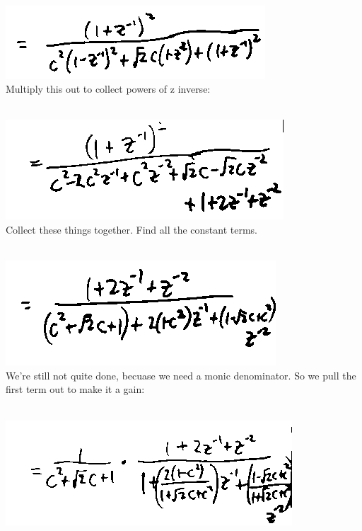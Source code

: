 \\
\includegraphics[scale=0.5]{frames/17g}\\

Multiply this out to collect powers of z inverse:

\\
\includegraphics[scale=0.5]{frames/17h}\\

Collect these things together. Find all the constant terms. 

\\
\includegraphics[scale=0.5]{frames/17i}\\

We're still not quite done, becuase we need a monic denominator. So we pull
the first term out to make it a gain:

\\
\includegraphics[scale=0.5]{frames/17j}\\

